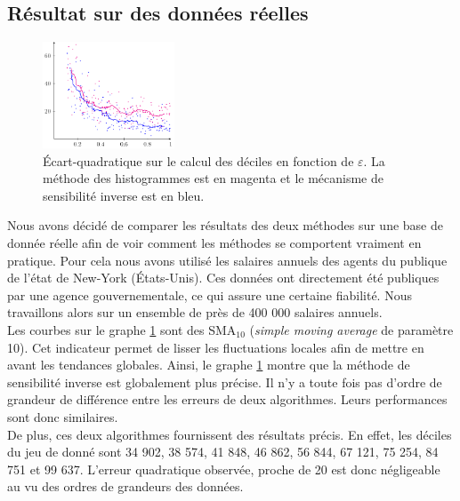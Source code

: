 \subsection{Résultat sur des données réelles}

\begin{figure}
    \centering
    \includegraphics[width=0.35\textwidth, clip]{"./proofs/fig2.pdf"}
    \caption{Écart-quadratique sur le calcul des déciles en fonction de \(\varepsilon\). La méthode des histogrammes est en {\color{magenta} magenta} et le mécanisme de sensibilité inverse est en {\color{blue} bleu}.}
    \label{fig2}
\end{figure}

{Nous avons décidé de comparer les résultats des deux méthodes sur une base de donnée réelle \cite{salaries} afin de voir comment les méthodes se comportent vraiment en pratique. Pour cela nous avons utilisé les salaires annuels des agents du publique de l'état de New-York (États-Unis). Ces données ont directement été publiques par une agence gouvernementale, ce qui assure une certaine fiabilité. Nous travaillons alors sur un ensemble de près de 400 000 salaires annuels.\\

Les courbes sur le graphe \ref{fig2} sont des SMA\(_{10}\) (\textit{simple moving average} de paramètre 10). Cet indicateur permet de lisser les fluctuations locales afin de mettre en avant les tendances globales. Ainsi, le graphe \ref{fig2} montre que la méthode de sensibilité inverse est globalement plus précise. Il n'y a toute fois pas d'ordre de grandeur de différence entre les erreurs de deux algorithmes. Leurs performances sont donc similaires.\\

De plus, ces deux algorithmes fournissent des résultats précis. En effet, les déciles du jeu de donné sont 34 902, 38 574, 41 848, 46 862, 56 844, 67 121, 75 254, 84 751 et 99 637. L'erreur quadratique observée, proche de 20 est donc négligeable au vu des ordres de grandeurs des données.}





